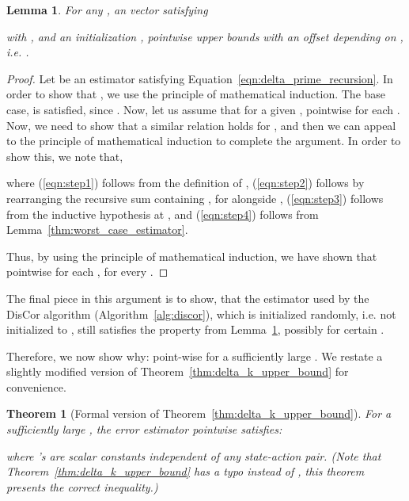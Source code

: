 \documentclass[jmlr]{article}
\newtheorem{theorem}{Theorem}[section]
\newtheorem{lemma}{Lemma}[theorem]
\begin{document}
\begin{lemma}
\label{thm:intermediate}
For any , an vector  satisfying

with , and an initialization , pointwise upper bounds  with an offset depending on , i.e. .
\end{lemma}
\begin{proof}
Let  be an estimator satisfying Equation~\ref{eqn:delta_prime_recursion}. In order to show that , we use the principle of mathematical induction. The base case,  is satisfied, since . Now, let us assume that for a given ,  pointwise for each . Now, we need to show that a similar relation holds for , and then we can appeal to the principle of mathematical induction to complete the argument. In order to show this, we note that,

where (\ref{eqn:step1}) follows from the definition of , (\ref{eqn:step2}) follows by rearranging the recursive sum containing , for  alongside , (\ref{eqn:step3}) follows from the inductive hypothesis at , and (\ref{eqn:step4}) follows from Lemma~\ref{thm:worst_case_estimator}.

Thus, by using the principle of mathematical induction, we have shown that  pointwise for each , for every .
\end{proof}

The final piece in this argument is to show, that the estimator  used by the DisCor algorithm (Algorithm~\ref{alg:discor}), which is initialized randomly, i.e. not initialized to , still satisfies the property from Lemma~\ref{thm:intermediate}, possibly for certain .

Therefore, we now show why:  point-wise for a sufficiently large . We restate a slightly modified version of Theorem~\ref{thm:delta_k_upper_bound} for convenience. 
\begin{theorem}[Formal version of Theorem~\ref{thm:delta_k_upper_bound}]
\label{thm:alpha}
For a sufficiently large , the error estimator  pointwise  satisfies:

where 's are scalar constants independent of any state-action pair. \textit{(Note that Theorem~\ref{thm:delta_k_upper_bound} has a typo  instead of , this theorem presents the correct inequality.})
\end{theorem}
\end{document}
